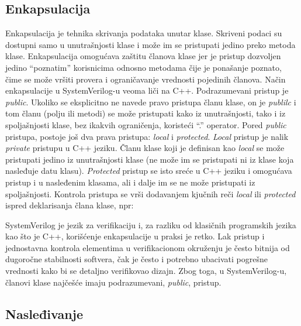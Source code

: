 
\subsection{Enkapsulacija}

Enkapsulacija je tehnika skrivanja podataka unutar klase. Skriveni podaci su
dostupni samo u unutrašnjosti klase i može im se pristupati jedino preko metoda
klase. Enkapsulacija omogućava zaštitu članova klase jer je pristup dozvoljen
jedino ``poznatim'' korisnicima odnosno metodama čije je ponašanje poznato, čime
se može vršiti provera i ograničavanje vrednosti pojedinih članova. Način
enkapsulacije u SystemVerilog-u veoma liči na C++. Podrazumevani pristup je
\emph{public}. Ukoliko se eksplicitno ne navede pravo pristupa članu klase, on
je \emph{publilc} i tom članu (polju ili metodi) se može pristupati kako iz
unutrašnjosti, tako i iz spoljašnjosti klase, bez ikakvih ograničenja, koristeći
``.'' operator. Pored \emph{public} pristupa, postoje još dva prava pristupa:
\emph{local} i \emph{protected}. \emph{Local} pristup je nalik \emph{private}
pristupu u C++ jeziku. Članu klase koji je definisan kao \emph{local} se može
pristupati jedino iz unutrašnjosti klase (ne može im se pristupati ni iz klase
koja nasleđuje datu klasu). \emph{Protected} pristup se isto sreće u C++ jeziku
i omogućava pristup i u nasleđenim klasama, ali i dalje im se ne može
pristupati iz spoljašnjosti. Kontrola pristupa se vrši dodavanjem kjučnih reči
\emph{local} ili \emph{protected} ispred deklarisanja člana klase, npr:



SystemVerilog je jezik za verifikaciju i, za razliku od klasičnih programskih
jezika kao što je C++, korišćenje enkapsulacije u praksi je retko. Lak pristup i
jednostavna kontrola elementima u verifikacionom okruženju je često bitnija od
dugoročne stabilnosti softvera, čak je često i potrebno ubacivati pogrešne
vrednosti kako bi se detaljno verifikovao dizajn. Zbog toga, u SystemVerilog-u,
članovi klase najčešće imaju podrazumevani, \emph{public}, pristup.


\subsection{Nasleđivanje}

